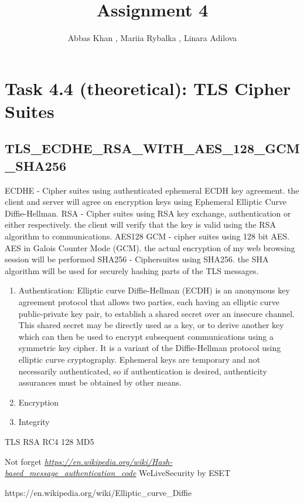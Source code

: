 \documentclass{article}
\title{Assignment 4}
\author{Abbas Khan , Mariia Rybalka , Linara Adilova}
\begin{document}
\maketitle 
    
\section*{Task 4.4 (theoretical): TLS Cipher Suites}
\subsection*{TLS\_ECDHE\_RSA\_WITH\_AES\_128\_GCM\_SHA256}
ECDHE - Cipher suites using authenticated ephemeral ECDH key agreement. the client and server will agree on encryption keys using Ephemeral Elliptic Curve Diffie-Hellman. 
RSA - Cipher suites using RSA key exchange, authentication or either respectively. the client will verify that the key is valid using the RSA algorithm to communications.
AES128 GCM - cipher suites using 128 bit AES. AES in Galois Counter Mode (GCM). the actual encryption of my web browsing session will be performed
SHA256 - Ciphersuites using SHA256. the SHA algorithm will be used for securely hashing parts of the TLS messages.

\begin{enumerate}
\item Authentication: Elliptic curve Diffie-Hellman (ECDH) is an anonymous key agreement protocol that allows two parties, each having an elliptic curve public-private key pair, to establish a shared secret over an insecure channel. This shared secret may be directly used as a key, or to derive another key which can then be used to encrypt subsequent communications using a symmetric key cipher. It is a variant of the Diffie-Hellman protocol using elliptic curve cryptography. Ephemeral keys are temporary and not necessarily authenticated, so if authentication is desired, authenticity assurances must be obtained by other means.
\item Encryption
\item Integrity
\end{enumerate}

TLS RSA RC4 128 MD5

\cite{label}

\begin{thebibliography}{9}

  Not forget
  \emph{\url{https://en.wikipedia.org/wiki/Hash-based_message_authentication_code}}
  WeLiveSecurity by ESET
  
  https://en.wikipedia.org/wiki/Elliptic_curve_Diffie%
  
\end{thebibliography}
\end{document}
